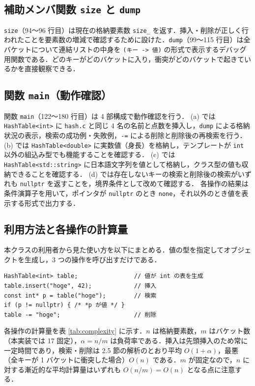 \subsection{補助メンバ関数 {\tt size} と {\tt dump}}

{\tt size}（94〜96 行目）は現在の格納要素数 {\tt size\_} を返す．挿入・削除が正しく行われたことを要素数の増減で確認するために設けた．{\tt dump}（99〜115 行目）は全バケットについて連結リストの中身を {\tt (キー -> 値)} の形式で表示するデバッグ用関数である．どのキーがどのバケットに入り，衝突がどのバケットで起きているかを直接観察できる．

\subsection{関数 {\tt main}（動作確認）}

関数 {\tt main}（122〜180 行目）は 4 部構成で動作確認を行う．
(a) では {\tt HashTable<int>} に {\tt hash.c} と同じ 4 名の名前と点数を挿入し，{\tt dump} による格納状況の表示，検索の成功例・失敗例，{\tt -=} による削除と削除後の再検索を行う．
(b) では {\tt HashTable<double>} に実数値（身長）を格納し，テンプレートが {\tt int} 以外の組込み型でも機能することを確認する．
(c) では {\tt HashTable<std::string>} に日本語文字列を値として格納し，クラス型の値も収納できることを確認する．
(d) では存在しないキーの検索と削除後の検索がいずれも {\tt nullptr} を返すことを，境界条件として改めて確認する．
各操作の結果は条件演算子を用いて，ポインタが {\tt nullptr} のとき {\tt none}，それ以外のとき値を表示する形式で出力する．

\subsection{利用方法と各操作の計算量}

本クラスの利用者から見た使い方を以下にまとめる．値の型を指定してオブジェクトを生成し，3 つの操作を呼び出すだけである．

\begin{verbatim}
HashTable<int> table;                // 値が int の表を生成
table.insert("hoge", 42);            // 挿入
const int* p = table("hoge");        // 検索
if (p != nullptr) { /* *p が値 */ }
table -= "hoge";                     // 削除
\end{verbatim}

各操作の計算量を表 \ref{tab:complexity} に示す．$n$ は格納要素数，$m$ はバケット数（本実装では 17 固定），$\alpha = n/m$ は負荷率である．挿入は先頭挿入のため常に一定時間であり，検索・削除は 2.5 節の解析のとおり平均 $O(1+\alpha)$，最悪（全キーが 1 バケットに衝突した場合）$O(n)$ である．$m$ が固定なので，$n$ に対する漸近的な平均計算量はいずれも $O(n/m) = O(n)$ となる点に注意する．


